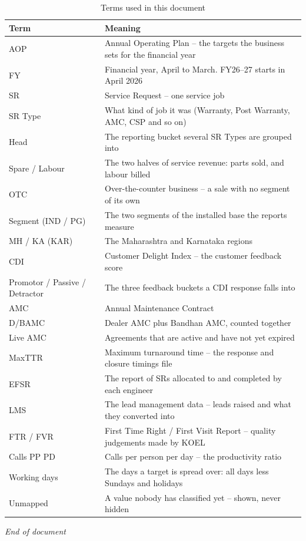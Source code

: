 \documentclass[11pt,a4paper]{article}
\begin{document}
\begin{table}[H]\centering\small
\begin{tabularx}{\linewidth}{@{}p{3.5cm}X@{}}
\toprule
\textbf{Term} & \textbf{Meaning} \\
\midrule
AOP & Annual Operating Plan -- the targets the business sets for the financial year \\
FY & Financial year, April to March. FY26--27 starts in April 2026 \\
SR & Service Request -- one service job \\
SR Type & What kind of job it was (Warranty, Post Warranty, AMC, CSP and so on) \\
Head & The reporting bucket several SR Types are grouped into \\
Spare / Labour & The two halves of service revenue: parts sold, and labour billed \\
OTC & Over-the-counter business -- a sale with no segment of its own \\
Segment (IND / PG) & The two segments of the installed base the reports measure \\
MH / KA (KAR) & The Maharashtra and Karnataka regions \\
CDI & Customer Delight Index -- the customer feedback score \\
Promotor / Passive / Detractor & The three feedback buckets a CDI response falls into \\
AMC & Annual Maintenance Contract \\
D/BAMC & Dealer AMC plus Bandhan AMC, counted together \\
Live AMC & Agreements that are active and have not yet expired \\
MaxTTR & Maximum turnaround time -- the response and closure timings file \\
EFSR & The report of SRs allocated to and completed by each engineer \\
LMS & The lead management data -- leads raised and what they converted into \\
FTR / FVR & First Time Right / First Visit Report -- quality judgements made by KOEL \\
Calls PP PD & Calls per person per day -- the productivity ratio \\
Working days & The days a target is spread over: all days less Sundays and holidays \\
Unmapped & A value nobody has classified yet -- shown, never hidden \\
\bottomrule
\end{tabularx}
\caption{Terms used in this document}
\end{table}

\vspace{12pt}
\begin{center}\small\itshape End of document\end{center}
\end{document}
